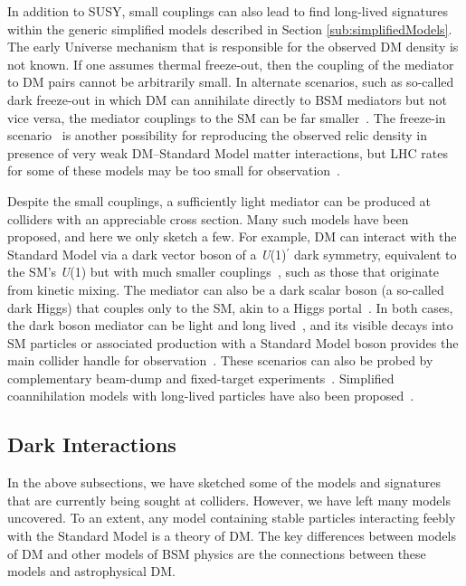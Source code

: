 \documentclass{ar-1col}
\begin{document}
In addition to SUSY, small couplings can also lead to find long-lived signatures within the
generic simplified models described in Section \ref{sub:simplifiedModels}. 
The early Universe mechanism that is
responsible for the observed DM density is not known. 
If one assumes thermal freeze-out, then the
coupling of the mediator to DM pairs cannot be arbitrarily small. 
In alternate scenarios,
such as so-called dark freeze-out in which DM can annihilate directly to
BSM mediators but not vice versa, the mediator couplings to the SM
can be far smaller~\cite{Pospelov:2007mp,Das:2010ts,Evans:2017kti}. 
The freeze-in
scenario~\cite{Co:2015pka,Bernal:2017kxu} is another possibility
for reproducing the observed relic density in presence of very weak DM--Standard Model matter interactions,
but LHC rates for some of these models may be too small for observation~\cite{Kahlhoefer:2018xxo}. 

Despite the small couplings, a
sufficiently light mediator can be produced at colliders with
an appreciable cross section. Many such models have been proposed, and here 
we only sketch a few.  
For example, DM can interact with the Standard Model via a dark
vector boson of a \textit{U}(1)$^{\prime}$ dark symmetry, equivalent to the SM's \textit{U}(1)
but with much smaller couplings~\cite{Holdom:1985ag}, such as
those that originate from kinetic mixing. The mediator can also be a
dark scalar boson (a so-called dark Higgs) that couples only to the SM,
akin to a Higgs portal~\cite{Curtin:2014cca}. In both cases, the
dark boson mediator can be light and
long lived~\cite{Pospelov:2007mp}, and its visible decays into SM
particles or associated production with a Standard Model boson provides the
main collider handle for observation~\cite{Curtin:2014cca}. These
scenarios can also be probed by complementary beam-dump and fixed-target experiments~\cite{Battaglieri:2017aum}. Simplified
coannihilation models with long-lived particles have also been
proposed~\cite{ElHedri:2017nny}.


\subsection{Dark Interactions}\label{sec:darkint}

In the above subsections, we have sketched some of the models and signatures
that are currently being sought at colliders. However, we have left many models uncovered. 
To an extent, any model containing stable particles interacting
feebly with the Standard Model is a theory of DM.
The key differences between models of DM and other models of BSM
physics are the connections
between these models and astrophysical DM.
\end{document}
